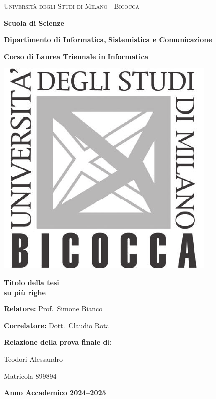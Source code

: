 
\begin{titlepage}
  \centering

  {\LARGE\textsc{Università degli Studi di Milano - Bicocca}\par}
  \vspace{2mm}
  {\Large\textbf{Scuola di Scienze}\par}
  {\large\textbf{Dipartimento di Informatica, Sistemistica e Comunicazione}\par}
  {\normalsize\textbf{Corso di Laurea Triennale in Informatica}\par}

  \vspace{12mm}
  \includegraphics[scale=0.7]{img/logo-bicocca.pdf}

  \vspace{12mm}
  {\Huge\bfseries Titolo della tesi \\ su più righe\par}

  \vspace{20mm}
  \begin{flushleft}
    {\large \textbf{Relatore:} Prof.\ Simone Bianco\par}
    {\large \textbf{Correlatore:} Dott.\ Claudio Rota\par}
  \end{flushleft}

  \vspace{8mm}
  \begin{flushright}
    {\large \textbf{Relazione della prova finale di:}\par}
    {\large Teodori Alessandro\par}
    {\large Matricola 899894\par}
  \end{flushright}

  \vfill
  {\large\bfseries Anno Accademico 2024--2025\par}
\end{titlepage}

\restoregeometry
   
